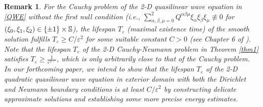 \documentclass[11pt,twoside]{article}
\def\SS{\mathop{\mathbb S\kern 0pt}\nolimits}
\def\ds{\displaystyle}
\def\ve{\varepsilon}
\theoremstyle{plain}
\newtheorem{remark}{Remark}[section]
\theoremstyle{definition}
\numberwithin{equation}{section}
\begin{document}
\begin{remark}\label{YinA-1}
For the Cauchy problem of the 2-D quasilinear wave equation in \eqref{QWE} without the first null condition
(i.e., $\ds\sum_{\alpha,\beta,\mu=0}^2Q^{\alpha\beta\mu}\xi_{\alpha}\xi_{\beta}\xi_{\mu}\not\equiv0$ for
$(\xi_0,\xi_1,\xi_2)\in\{\pm1\}\times\SS$), the lifespan $T_\ve$ (maximal existence time) of the smooth solution fulfills $T_\ve\ge C/\ve^2$ for
some suitable constant $C>0$ (see Chapter 6 of \cite{Hormander97book}).
Note that the lifespan $T_\ve$ of the 2-D Cauchy-Neumann problem in Theorem \ref{thm1} satisfies $T_\ve\ge\frac{1}{\ve^{2-}}$,
which is only arbitrarily close to that of the Cauchy problem.
In our forthcoming paper, we intend to show that the lifespan $T_\ve$ of the 2-D quadratic quasilinear wave equation in exterior domain
with both the Dirichlet and Neumann boundary conditions is at least $C/\ve^2$ by constructing delicate approximate solutions and establishing
some more precise energy estimates.
\end{remark}
\end{document}
